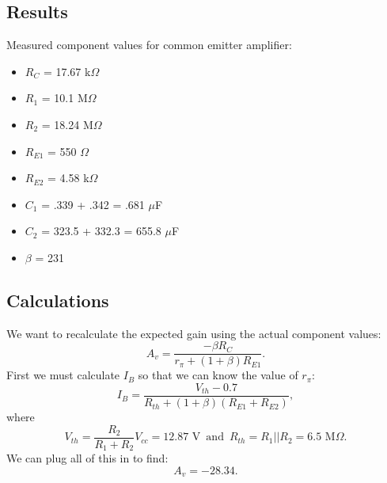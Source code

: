 \documentclass[12pt,letterpaper]{report}
\begin{document}
\subsection*{Results}

Measured component values for common emitter amplifier:
\begin{itemize}
\item $R_C$ = 17.67 k$\Omega$
\item $R_1$ = 10.1 M$\Omega$
\item $R_2$ = 18.24 M$\Omega$
\item $R_{E1}$ = 550 $\Omega$
\item $R_{E2}$ = 4.58 k$\Omega$
\item $C_1$ = .339 + .342 = .681 $\mu$F
\item $C_2$ = 323.5 + 332.3 = 655.8 $\mu$F
\item $\beta$ = 231
\end{itemize}



\subsection*{Calculations}

We want to recalculate the expected gain using the actual component values:
$$
A_v = \frac{-\beta R_C}{r_{\pi}+(1+\beta)R_{E1}}.
$$
First we must calculate $I_B$ so that we can know the value of $r_{\pi}$:
$$
I_B = \frac{V_{th}-0.7}{R_{th}+(1+\beta)(R_{E1}+R_{E2})},
$$
where
$$
V_{th} = \frac{R_2}{R_1+R_2}V_{cc} = 12.87 \text{ V}\, \text{ and } \, 
R_{th} = R_1||R_2 = 6.5 \text{ M}\Omega.
$$
We can plug all of this in to find:
$$
A_v = -28.34.
$$
\end{document}
